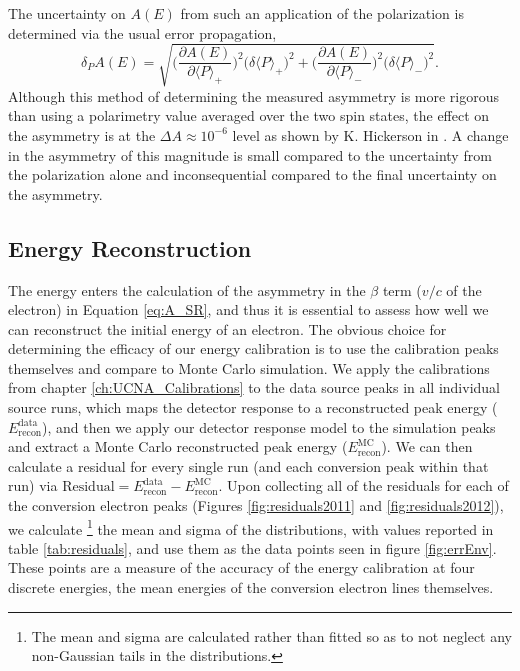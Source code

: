 The uncertainty on $A(E)$ from such an application of the polarization is determined via
the usual error propagation,
%
\begin{equation}
  \delta_PA(E) = \sqrt{\bigg(\frac{\partial A(E)}{\partial \langle P \rangle_+}\bigg)^2
    \Big(\delta \langle P \rangle_+\Big)^2 +
    \bigg( \frac{\partial A(E)}{\partial \langle P \rangle_-}\bigg)^2
    \Big(\delta \langle P \rangle_-\Big)^2}.
\end{equation}
%
Although this method of determining the measured asymmetry is more rigorous than using a
polarimetry value averaged over the two spin states, the effect on the asymmetry is
at the $\Delta A \approx 10^{-6}$ level as shown by K. Hickerson in \cite{hickerson2013}.
A change in the asymmetry of this magnitude is small compared to the uncertainty from
the polarization alone and inconsequential compared
to the final uncertainty on the asymmetry. 


\subsection{Energy Reconstruction} \label{ssec:energyRecon}

The energy enters the calculation of the asymmetry in the $\beta$ term ($v/c$ of the
electron) in Equation \ref{eq:A_SR}, and thus it is essential to assess how well
we can reconstruct the initial energy of an electron. The obvious choice for determining
the efficacy of our energy calibration is to use the calibration peaks themselves and
compare to Monte Carlo simulation. We apply the calibrations from
chapter \ref{ch:UCNA_Calibrations} to the data source peaks in all
individual source runs,
which maps the detector response to a reconstructed peak energy ($E_{\mathrm{recon}}^{\mathrm{data}}$),
and then we apply our
detector response model to the simulation peaks and extract a Monte Carlo reconstructed peak energy
($E_{\mathrm{recon}}^{\mathrm{MC}}$). We can then calculate a residual for every single run (and each
conversion peak within that run) via
$\mathrm{Residual} = E_{\mathrm{recon}}^{\mathrm{data}} - E_{\mathrm{recon}}^{\mathrm{MC}}$. Upon collecting all
of the residuals for each of the conversion electron peaks (Figures \ref{fig:residuals2011}
and \ref{fig:residuals2012}), we calculate
\footnote{ \label{fn:sourceMean}The mean and sigma are calculated rather than fitted so as to not neglect any
  non-Gaussian tails in the distributions.} the mean and sigma of the distributions, with
values reported in table \ref{tab:residuals}, and use
them as the data points seen in figure \ref{fig:errEnv}. These points are a measure
of the accuracy of the energy calibration at four discrete energies, the mean energies of the
conversion electron lines themselves.

